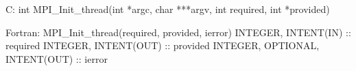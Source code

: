 C:
int MPI_Init_thread(int *argc, char ***argv, int required, int *provided)

Fortran:
MPI_Init_thread(required, provided, ierror)
INTEGER, INTENT(IN) :: required
INTEGER, INTENT(OUT) :: provided
INTEGER, OPTIONAL, INTENT(OUT) :: ierror
